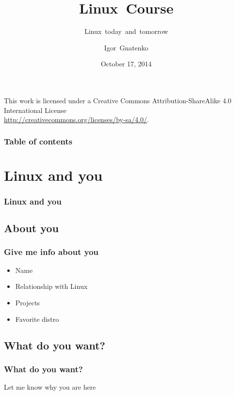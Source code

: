 \documentclass{beamer}
\title{Linux~Course}
\subtitle{Linux~today~and~tomorrow}
\author{Igor~Gnatenko}
\date{October 17, 2014}
\begin{document}
\begin{frame}
\titlepage
\null
\vfill
\begin{flushright}
{\tiny
This work is licensed under a Creative Commons Attribution-ShareAlike 4.0
International License\\
\href{http://creativecommons.org/licenses/by-sa/4.0/}{http://creativecommons.org/licenses/by-sa/4.0/}.}
\end{flushright}
\end{frame}

\begin{frame}
\frametitle{Table of contents}
\tableofcontents
\end{frame}

\section{Linux and you}
\begin{frame}
\frametitle<presentation>{Linux and you}
\end{frame}

\subsection{About you}
\begin{frame}
\frametitle{Give me info about you}
\begin{itemize}
  \item Name
  \item Relationship with Linux
  \item Projects
  \item Favorite distro
\end{itemize}
\end{frame}

\subsection{What do you want?}
\begin{frame}
\frametitle{What do you want?}
Let me know why you are here
\end{frame}
\end{document}
